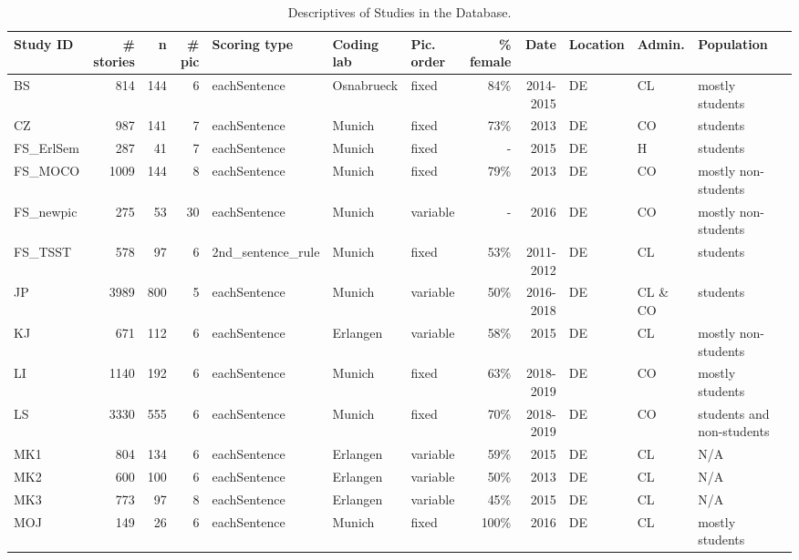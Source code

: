 \documentclass[man,a4paper,mask]{apa6}\usepackage[]{graphicx}\usepackage[]{color}
\begin{document}
\begin{table}
\begin{threeparttable}
		\caption{Descriptives of Studies in the Database.}
		\label{tab:studies}
		\scriptsize
		\begin{tabularx}{\textwidth}{lrrrlllrrllll}
		\toprule


Study ID & \# stories & n & \# pic & Scoring type & Coding lab & Pic. order & \% female & Date & Location & Admin. & Population \\ 
  \hline
BS & 814 & 144 &   6 & eachSentence & Osnabrueck & fixed & 84\% & 2014-2015 & DE & CL & mostly students \\ 
  CZ & 987 & 141 &   7 & eachSentence & Munich & fixed & 73\% & 2013 & DE & CO & students \\ 
  FS\_ErlSem & 287 &  41 &   7 & eachSentence & Munich & fixed & - & 2015 & DE & H & students \\ 
  FS\_MOCO & 1009 & 144 &   8 & eachSentence & Munich & fixed & 79\% & 2013 & DE & CO & mostly non-students \\ 
  FS\_newpic & 275 &  53 &  30 & eachSentence & Munich & variable & - & 2016 & DE & CO & mostly non-students \\ 
  FS\_TSST & 578 &  97 &   6 & 2nd\_sentence\_rule & Munich & fixed & 53\% & 2011-2012 & DE & CL & students \\ 
  JP & 3989 & 800 &   5 & eachSentence & Munich & variable & 50\% & 2016-2018 & DE & CL \& CO & students \\ 
  KJ & 671 & 112 &   6 & eachSentence & Erlangen & variable & 58\% & 2015 & DE & CL & mostly non-students \\ 
  LI & 1140 & 192 &   6 & eachSentence & Munich & fixed & 63\% & 2018-2019 & DE & CO & mostly students \\ 
  LS & 3330 & 555 &   6 & eachSentence & Munich & fixed & 70\% & 2018-2019 & DE & CO & students and non-students \\ 
  MK1 & 804 & 134 &   6 & eachSentence & Erlangen & variable & 59\% & 2015 & DE & CL & N/A \\ 
  MK2 & 600 & 100 &   6 & eachSentence & Erlangen & variable & 50\% & 2013 & DE & CL & N/A \\ 
  MK3 & 773 &  97 &   8 & eachSentence & Erlangen & variable & 45\% & 2015 & DE & CL & N/A \\ 
  MOJ & 149 &  26 &   6 & eachSentence & Munich & fixed & 100\% & 2016 & DE & CL & mostly students \\ 

\end{tabularx}
\end{threeparttable}
\end{table}
\end{document}

